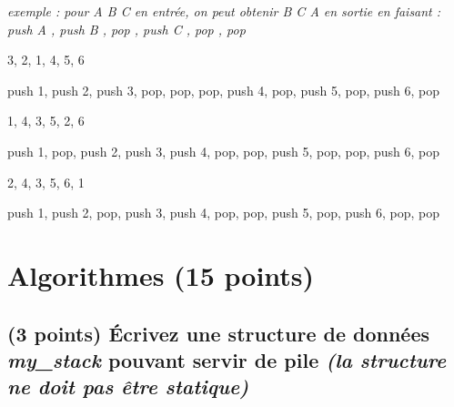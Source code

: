 \documentclass[11pt,a4paper]{article}
\begin{document}
\bigskip

\begin{center}
\noindent \textit{exemple : pour \og A B C \fg{} en entrée, on peut obtenir \og B C A \fg{} en sortie en faisant : \linebreak
\og push A \fg, \og push B \fg, \og pop \fg, \og push C \fg, \og pop \fg, \og pop \fg }
\end{center}

\medskip


\begin{center}

\begin{large}
3, 2, 1, 4, 5, 6
\end{large}

\begin{center}
 push 1, push 2, push 3, pop, pop, pop, push 4, pop, push 5, pop, push 6, pop
\end{center}


\begin{large}
1, 4, 3, 5, 2, 6
\end{large}

\begin{center}
 push 1, pop, push 2, push 3, push 4, pop, pop, push 5, pop, pop, push 6, pop
\end{center}


\begin{large}
2, 4, 3, 5, 6, 1
\end{large}

\begin{center}
 push 1, push 2, pop, push 3, push 4, pop, pop, push 5, pop, push 6, pop, pop
\end{center}

\end{center}


%
\section{Algorithmes (15 points)}

\subsection{(3 points) \'Ecrivez une structure de données \og \textit{my\_stack} \fg{} pouvant servir de pile \textit{(la structure ne doit pas être statique)} }
\end{document}
